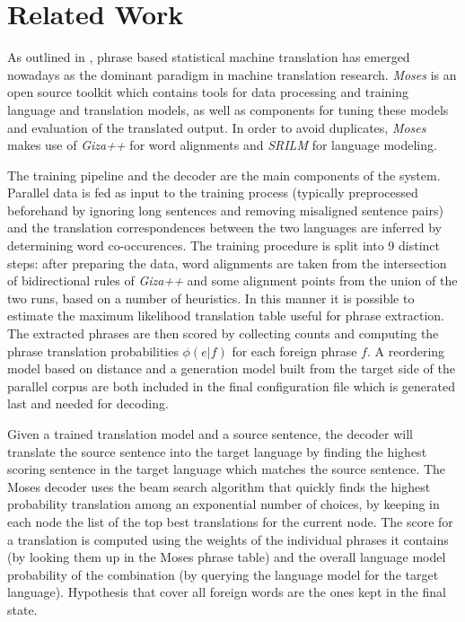 \documentclass[11pt]{article}
\begin{document}
\section{Related Work}
\label{existing}
As outlined in \cite{moses}, phrase based statistical machine translation has emerged nowadays as the dominant paradigm in machine translation research. \textit{Moses} \cite{mosesurl} is an open source toolkit which contains tools for data processing and training language and translation models, as well as components for tuning these models and evaluation of the translated output. In order to avoid duplicates, \textit{Moses} makes use of \textit{Giza++} \cite{giza++} for word alignments and \textit{SRILM} \cite{srilm} for language modeling. 

The training pipeline and the decoder are the main components of the system. Parallel data is fed as input to the training process (typically preprocessed beforehand by ignoring long sentences and removing misaligned sentence pairs) and the translation correspondences between the two languages are inferred by determining word co-occurences. The training procedure is split into 9 distinct steps: after preparing the data, word alignments are taken from the intersection of bidirectional rules of \textit{Giza++} and some alignment points from the union of the two runs, based on a number of heuristics. In this manner it is possible to estimate the maximum likelihood translation table useful for phrase extraction. The extracted phrases are then scored by collecting counts and computing the phrase translation probabilities $\phi(e|f)$ for each foreign phrase $f$. A reordering model based on distance and a generation model built from the target side of the parallel corpus are both included in the final configuration file which is generated last and needed for decoding.

Given a trained translation model and a source sentence, the decoder will translate the source sentence into the target language by finding the highest scoring sentence in the target language which matches the source sentence. The Moses decoder uses the beam search algorithm that quickly finds the highest probability translation among an exponential number of choices, by keeping in each node the list of the top best translations for the current node. The score for a translation is computed using the weights of the individual phrases it contains (by looking them up in the Moses phrase table) and the overall language model probability of the combination (by querying the language model for the target language). Hypothesis that cover all foreign words are the ones kept in the final state.
\end{document}
